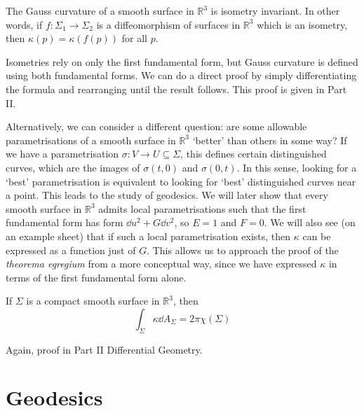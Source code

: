 \documentclass[a4paper,11pt]{article}
\begin{document}
\begin{theorem}
	The Gauss curvature of a smooth surface in \( \mathbb R^3 \) is isometry invariant.
	In other words, if \( f \colon \Sigma_1 \to \Sigma_2 \) is a diffeomorphism of surfaces in \( \mathbb R^3 \) which is an isometry, then \( \kappa(p) = \kappa(f(p)) \) for all \( p \).
\end{theorem}
\begin{remark}
	Isometries rely on only the first fundamental form, but Gauss curvature is defined using both fundamental forms.
	We can do a direct proof by simply differentiating the formula and rearranging until the result follows.
	This proof is given in Part II.

	Alternatively, we can consider a different question: are some allowable parametrisations of a smooth surface in \( \mathbb R^3 \) `better' than others in some way?
	If we have a parametrisation \( \sigma \colon V \to U \subseteq \Sigma \), this defines certain distinguished curves, which are the images of \( \sigma(t,0) \) and \( \sigma(0,t) \).
	In this sense, looking for a `best' parametrisation is equivalent to looking for `best' distinguished curves near a point.
	This leads to the study of geodesics.
	We will later show that every smooth surface in \( \mathbb R^3 \) admits local parametrisations such that the first fundamental form has form \( \dd{u}^2 + G \dd{v}^2 \), so \( E = 1 \) and \( F = 0 \).
	We will also see (on an example sheet) that if such a local parametrisation exists, then \( \kappa \) can be expressed as a function just of \( G \).
	This allows us to approach the proof of the \textit{theorema egregium} from a more conceptual way, since we have expressed \( \kappa \) in terms of the first fundamental form alone.
\end{remark}
\begin{theorem}
	If \( \Sigma \) is a compact smooth surface in \( \mathbb R^3 \), then
	\[
		\int_\Sigma \kappa \dd{A_\Sigma} = 2 \pi \chi(\Sigma)
	\]
\end{theorem}
Again, proof in Part II Differential Geometry.

\section{Geodesics}
\end{document}

